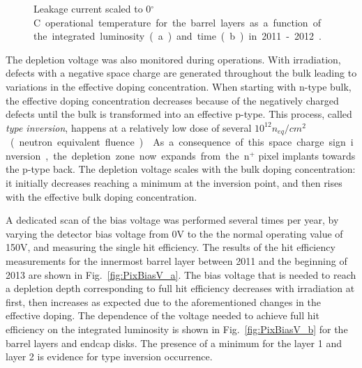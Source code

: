 \begin{figure}[!htb]
 \begin{center}
 \end{center}
 \caption{Leakage current scaled to 0\unit{$^\circ$C} operational temperature for the barrel layers as a function of the integrated luminosity (a) and time (b) in 2011-2012~\cite{Zenz:2013rva}.}
 \label{fig:PixLeakageCurrent}
\end{figure}

The depletion voltage was also monitored during operations.
With irradiation, defects with a negative space charge are generated throughout the bulk leading to variations in the effective doping concentration.
When starting with n-type bulk, the effective doping concentration decreases because of the negatively charged defects until the bulk is transformed into an effective p-type.
This process, called \textit{type inversion}, happens at a relatively low dose of several $10^{12}$\unit{$n_{eq}/cm^2$} (neutron equivalent fluence)~\cite{PixelDetectorsBook2006}.
As a consequence of this space charge sign inversion, the depletion zone now expands from the n$^+$ pixel implants towards the p-type back.
The depletion voltage scales with the bulk doping concentration: it initially decreases reaching a minimum at the inversion point, and then rises with the effective bulk doping concentration.

A dedicated scan of the bias voltage was performed several times per year, by varying the detector bias voltage from 0\unit{V} to the the normal operating value of 150\unit{V}, and measuring the single hit efficiency.
The results of the hit efficiency measurements for the innermost barrel layer between 2011 and the beginning of 2013 are shown in Fig.~\ref{fig:PixBiasV_a}.
The bias voltage that is needed to reach a depletion depth corresponding to full hit efficiency decreases with irradiation at first, then increases as expected due to the aforementioned changes in the effective doping.
The dependence of the voltage needed to achieve full hit efficiency on the integrated luminosity is shown in Fig.~\ref{fig:PixBiasV_b} for the barrel layers and endcap disks.
The presence of a minimum for the layer 1 and layer 2 is evidence for type inversion occurrence.\\

